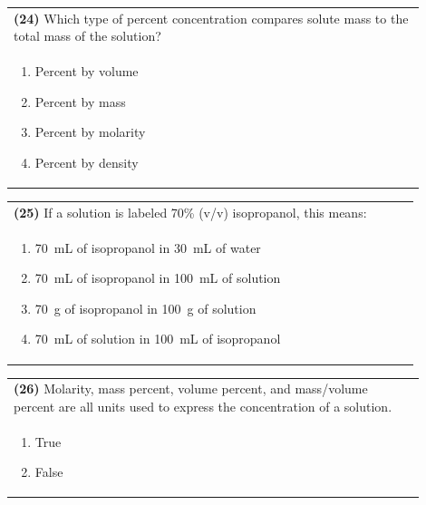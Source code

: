 \documentclass{article}
\begin{document}
\noindent\begin{tabular}{|p{0.9\linewidth}|}
\hline
\textbf{(24)} Which type of percent concentration compares solute mass to the total mass of the solution?\\[0.2cm]
\begin{minipage}[t]{0.85\linewidth}
\begin{enumerate}[label=\alph*.]
\item Percent by volume
\item Percent by mass
\item Percent by molarity
\item Percent by density
\end{enumerate}
\end{minipage}\\[0.2cm]
\hline
\end{tabular}
\newpage

\noindent\begin{tabular}{|p{0.9\linewidth}|}
\hline
\textbf{(25)} If a solution is labeled 70\% (v/v) isopropanol, this means:\\[0.2cm]
\begin{minipage}[t]{0.85\linewidth}
\begin{enumerate}[label=\alph*.]
\item 70~mL of isopropanol in 30~mL of water
\item 70~mL of isopropanol in 100~mL of solution
\item 70~g of isopropanol in 100~g of solution
\item 70~mL of solution in 100~mL of isopropanol
\end{enumerate}
\end{minipage}\\[0.2cm]
\hline
\end{tabular}

\noindent\begin{tabular}{|p{0.9\linewidth}|}
\hline
\textbf{(26)} Molarity, mass percent, volume percent, and mass/volume percent are all units used to express the concentration of a solution.\\[0.2cm]
\begin{minipage}[t]{0.85\linewidth}
\begin{enumerate}[label=\alph*.]
\item True
\item False
\end{enumerate}
\end{minipage}\\[0.2cm]
\hline
\end{tabular}
\end{document}
